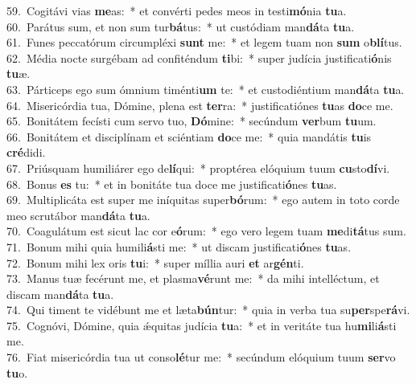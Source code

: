 {59.~}Cogitávi vias \textbf{me}as:~* et convérti pedes meos in testi\textbf{mó}nia \textbf{tu}a.\\
{60.~}Parátus sum, et non sum tur\textbf{bá}tus:~* ut custódiam man\textbf{dá}ta \textbf{tu}a.\\
{61.~}Funes peccatórum circumpléxi \textbf{sunt} me:~* et legem tuam non \textbf{sum} o\textbf{blí}tus.\\
{62.~}Média nocte surgébam ad confiténdum \textbf{ti}bi:~* super judícia justificati\textbf{ó}nis \textbf{tu}æ.\\
{63.~}Párticeps ego sum ómnium timénti\textbf{um} te:~* et custodiéntium man\textbf{dá}ta \textbf{tu}a.\\
{64.~}Misericórdia tua, Dómine, plena est \textbf{ter}ra:~* justificatiónes \textbf{tu}as \textbf{do}ce me.\\
{65.~}Bonitátem fecísti cum servo tuo, \textbf{Dó}mine:~* secúndum \textbf{ver}bum \textbf{tu}um.\\
{66.~}Bonitátem et disciplínam et sciéntiam \textbf{do}ce me:~* quia mandátis \textbf{tu}is \textbf{cré}didi.\\
{67.~}Priúsquam humiliárer ego de\textbf{lí}qui:~* proptérea elóquium tuum \textbf{cu}sto\textbf{dí}vi.\\
{68.~}Bonus \textbf{es} tu:~* et in bonitáte tua doce me justificati\textbf{ó}nes \textbf{tu}as.\\
{69.~}Multiplicáta est super me iníquitas super\textbf{bó}rum:~* ego autem in toto corde meo scrutábor man\textbf{dá}ta \textbf{tu}a.\\
{70.~}Coagulátum est sicut lac cor e\textbf{ó}rum:~* ego vero legem tuam \textbf{me}di\textbf{tá}tus sum.\\
{71.~}Bonum mihi quia humili\textbf{á}sti me:~* ut discam justificati\textbf{ó}nes \textbf{tu}as.\\
{72.~}Bonum mihi lex oris \textbf{tu}i:~* super míllia auri \textbf{et} ar\textbf{gén}ti.\\
{73.~}Manus tuæ fecérunt me, et plasma\textbf{vé}runt me:~* da mihi intelléctum, et discam man\textbf{dá}ta \textbf{tu}a.\\
{74.~}Qui timent te vidébunt me et læta\textbf{bún}tur:~* quia in verba tua su\textbf{per}spe\textbf{rá}vi.\\
{75.~}Cognóvi, Dómine, quia ǽquitas judícia \textbf{tu}a:~* et in veritáte tua hu\textbf{mi}li\textbf{á}sti me.\\
{76.~}Fiat misericórdia tua ut conso\textbf{lé}tur me:~* secúndum elóquium tuum \textbf{ser}vo \textbf{tu}o.\\
